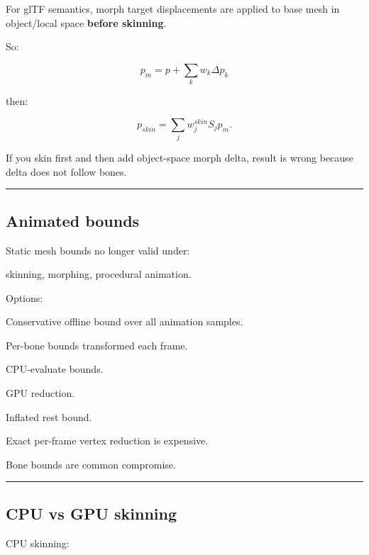 \hypertarget{04-visual-computing-ii-ch041-morph-before-or-after-skinning}{}

For glTF semantics, morph target displacements are applied to base mesh in object/local space \textbf{before skinning}.

So:

\[
\boxed{
p_m=
p+
\sum_kw_k\Delta p_k
}
\]

then:

\[
\boxed{
p_{skin}
=
\sum_j
w_j^{skin}
S_j
p_m.
}
\]

If you skin first and then add object-space morph delta, result is wrong because delta does not follow bones.

\begin{center}\rule{0.5\linewidth}{0.5pt}\end{center}

\subsection{Animated bounds}\label{04-visual-computing-ii-ch041-animated-bounds}

\hypertarget{04-visual-computing-ii-ch041-animated-bounds}{}

Static mesh bounds no longer valid under:

skinning, morphing, procedural animation.

Options:

Conservative offline bound over all animation samples.

Per-bone bounds transformed each frame.

CPU-evaluate bounds.

GPU reduction.

Inflated rest bound.

Exact per-frame vertex reduction is expensive.

Bone bounds are common compromise.

\begin{center}\rule{0.5\linewidth}{0.5pt}\end{center}

\subsection{CPU vs GPU skinning}\label{04-visual-computing-ii-ch041-cpu-vs-gpu-skinning}

\hypertarget{04-visual-computing-ii-ch041-cpu-vs-gpu-skinning}{}

CPU skinning:

